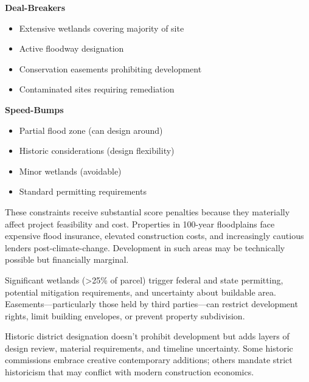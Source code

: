 \documentclass[
  letterpaper,
  DIV=11,
  numbers=noendperiod,
  oneside]{scrreprt}
\providecommand{\tightlist}{%
  \setlength{\itemsep}{0pt}\setlength{\parskip}{0pt}}
\begin{document}
\begin{tcolorbox}[enhanced jigsaw, bottomtitle=1mm, left=2mm, rightrule=.15mm, colbacktitle=quarto-callout-note-color!10!white, arc=.35mm, title=\textcolor{quarto-callout-note-color}{\faInfo}\hspace{0.5em}{Assessment Framework}, bottomrule=.15mm, colback=white, colframe=quarto-callout-note-color-frame, leftrule=.75mm, titlerule=0mm, opacitybacktitle=0.6, breakable, coltitle=black, toptitle=1mm, toprule=.15mm, opacityback=0]

\textbf{Deal-Breakers}

\begin{itemize}
\tightlist
\item
  Extensive wetlands covering majority of site
\item
  Active floodway designation
\item
  Conservation easements prohibiting development
\item
  Contaminated sites requiring remediation
\end{itemize}

\textbf{Speed-Bumps}

\begin{itemize}
\tightlist
\item
  Partial flood zone (can design around)
\item
  Historic considerations (design flexibility)
\item
  Minor wetlands (avoidable)
\item
  Standard permitting requirements
\end{itemize}

\end{tcolorbox}

These constraints receive substantial score penalties because they
materially affect project feasibility and cost. Properties in 100-year
floodplains face expensive flood insurance, elevated construction costs,
and increasingly cautious lenders post-climate-change. Development in
such areas may be technically possible but financially marginal.

Significant wetlands (\textgreater25\% of parcel) trigger federal and
state permitting, potential mitigation requirements, and uncertainty
about buildable area. Easements---particularly those held by third
parties---can restrict development rights, limit building envelopes, or
prevent property subdivision.

Historic district designation doesn't prohibit development but adds
layers of design review, material requirements, and timeline
uncertainty. Some historic commissions embrace creative contemporary
additions; others mandate strict historicism that may conflict with
modern construction economics.
\end{document}
